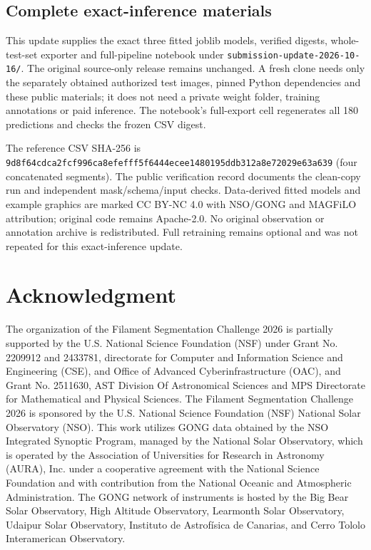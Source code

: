 \documentclass[sigconf]{acmart}
\begin{document}
\subsection{Complete exact-inference materials}
This update supplies the exact three fitted joblib models, verified digests, whole-test-set exporter and full-pipeline notebook under \texttt{submission-update-2026-10-16/}. The original source-only release remains unchanged. A fresh clone needs only the separately obtained authorized test images, pinned Python dependencies and these public materials; it does not need a private weight folder, training annotations or paid inference. The notebook's full-export cell regenerates all 180 predictions and checks the frozen CSV digest.

The reference CSV SHA-256 is \texttt{9d8f64cdca2fcf99}\linebreak\texttt{6ca8efefff5f6444}\linebreak\texttt{ecee1480195ddb31}\linebreak\texttt{2a8e72029e63a639} (four concatenated segments). The public verification record documents the clean-copy run and independent mask/schema/input checks. Data-derived fitted models and example graphics are marked CC BY-NC 4.0 with NSO/GONG and MAGFiLO attribution; original code remains Apache-2.0. No original observation or annotation archive is redistributed. Full retraining remains optional and was not repeated for this exact-inference update.

\section*{Acknowledgment}
The organization of the Filament Segmentation Challenge 2026 is partially supported by the U.S. National Science Foundation (NSF) under Grant No. 2209912 and 2433781, directorate for Computer and Information Science and Engineering (CSE), and Office of Advanced Cyberinfrastructure (OAC), and Grant No. 2511630, AST Division Of Astronomical Sciences and MPS Directorate for Mathematical and Physical Sciences. The Filament Segmentation Challenge 2026 is sponsored by the U.S. National Science Foundation (NSF) National Solar Observatory (NSO). This work utilizes GONG data obtained by the NSO Integrated Synoptic Program, managed by the National Solar Observatory, which is operated by the Association of Universities for Research in Astronomy (AURA), Inc. under a cooperative agreement with the National Science Foundation and with contribution from the National Oceanic and Atmospheric Administration. The GONG network of instruments is hosted by the Big Bear Solar Observatory, High Altitude Observatory, Learmonth Solar Observatory, Udaipur Solar Observatory, Instituto de Astrofísica de Canarias, and Cerro Tololo Interamerican Observatory.
\end{document}
